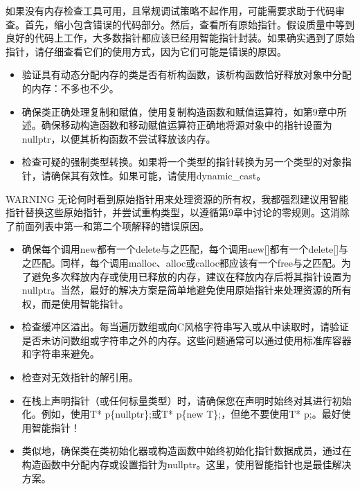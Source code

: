 如果没有内存检查工具可用，且常规调试策略不起作用，可能需要求助于代码审查。首先，缩小包含错误的代码部分。然后，查看所有原始指针。假设质量中等到良好的代码上工作，大多数指针都应该已经用智能指针封装。如果确实遇到了原始指针，请仔细查看它们的使用方式，因为它们可能是错误的原因。


\begin{itemize}
\item
验证具有动态分配内存的类是否有析构函数，该析构函数恰好释放对象中分配的内存：不多也不少。

\item
确保类正确处理复制和赋值，使用复制构造函数和赋值运算符，如第9章中所述。确保移动构造函数和移动赋值运算符正确地将源对象中的指针设置为nullptr，以便其析构函数不尝试释放该内存。

\item
检查可疑的强制类型转换。如果将一个类型的指针转换为另一个类型的对象指针，请确保其有效性。如果可能，请使用dynamic\_cast。
\end{itemize}

\begin{myWarning}{WARNING}
无论何时看到原始指针用来处理资源的所有权，我都强烈建议用智能指针替换这些原始指针，并尝试重构类型，以遵循第9章中讨论的零规则。这消除了前面列表中第一和第二个项解释的错误原因。
\end{myWarning}


\begin{itemize}
\item
确保每个调用new都有一个delete与之匹配，每个调用new[]都有一个delete[]与之匹配。同样，每个调用malloc、alloc或calloc都应该有一个free与之匹配。为了避免多次释放内存或使用已释放的内存，建议在释放内存后将其指针设置为nullptr。当然，最好的解决方案是简单地避免使用原始指针来处理资源的所有权，而是使用智能指针。

\item
检查缓冲区溢出。每当遍历数组或向C风格字符串写入或从中读取时，请验证是否未访问数组或字符串之外的内存。这些问题通常可以通过使用标准库容器和字符串来避免。

\item
检查对无效指针的解引用。

\item
在栈上声明指针（或任何标量类型）时，请确保您在声明时始终对其进行初始化。例如，使用T* p\{nullptr\};或T* p\{new T\};，但绝不要使用T* p;。最好使用智能指针！

\item
类似地，确保类在类初始化器或构造函数中始终初始化指针数据成员，通过在构造函数中分配内存或设置指针为nullptr。这里，使用智能指针也是最佳解决方案。
\end{itemize}


